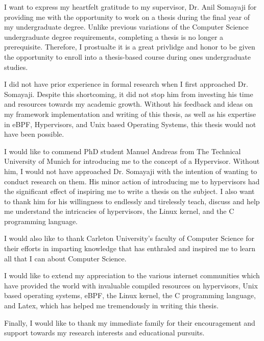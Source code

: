 \documentclass{report}
\begin{document}
\begin{spacing}{1.5}
{\large I want to express my heartfelt gratitude to my supervisor, Dr. Anil Somayaji for providing me with the opportunity to work on a thesis during the final year of my undergraduate degree. Unlike previous variations of the Computer Science undergraduate degree requirements, completing a thesis is no longer a prerequisite. Therefore, I prostualte it is a great privlidge and honor to be given the opportunity to enroll into a thesis-based course during ones undergraduate studies.}

{\large I did not have prior experience in formal research when I first approached Dr. Somayaji. Despite this shortcoming, it did not stop him from investing his time and resources towards my academic growth. Without his feedback and ideas on my framework implementation and writing of this thesis, as well as his expertise in eBPF, Hypervisors, and Unix based Operating Systems, this thesis would not have been possible.}

{\large I would like to commend PhD student Manuel Andreas from The Technical University of Munich for introducing me to the concept of a Hypervisor. Without him, I would not have approached Dr. Somayaji with the intention of wanting to conduct research on them. His minor action of introducing me to hypervisors had the significant effect of inspiring me to write a thesis on the subject. I also want to thank him for his willingness to endlessly and tirelessly teach, discuss and help me understand the intricacies of hypervisors, the Linux kernel, and the C programming language.} 

{\large I would also like to thank Carleton University's faculty of Computer Science for their efforts in imparting knowledge that has enthraled and inspired me to learn all that I can about Computer Science.}

{\large I would like to extend my appreciation to the various internet communities which have provided the world with invaluable compiled resources on hypervisors, Unix based operating systems, eBPF, the Linux kernel, the C programming language, and Latex, which has helped me tremendously in writing this thesis.}

{\large Finally, I would like to thank my immediate family for their encouragement and support towards my research interests and educational pursuits.}

\tableofcontents












\end{spacing}
\end{document}
